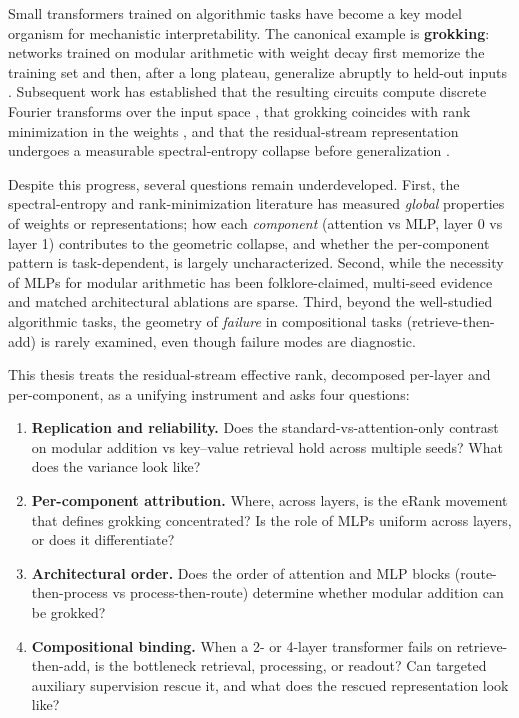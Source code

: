 \documentclass{article}
\begin{document}
Small transformers trained on algorithmic tasks have become a key model organism for mechanistic interpretability. The canonical example is \textbf{grokking}: networks trained on modular arithmetic with weight decay first memorize the training set and then, after a long plateau, generalize abruptly to held-out inputs \citep{power2022grokking}. Subsequent work has established that the resulting circuits compute discrete Fourier transforms over the input space \citep{nanda2023progress}, that grokking coincides with rank minimization in the weights \citep{liu2023grokkingrank,lyu2023dichotomy}, and that the residual-stream representation undergoes a measurable spectral-entropy collapse before generalization \citep{anonymous2026spectral,chen2025complexity}.

Despite this progress, several questions remain underdeveloped. First, the spectral-entropy and rank-minimization literature has measured \emph{global} properties of weights or representations; how each \emph{component} (attention vs MLP, layer 0 vs layer 1) contributes to the geometric collapse, and whether the per-component pattern is task-dependent, is largely uncharacterized. Second, while the necessity of MLPs for modular arithmetic has been folklore-claimed, multi-seed evidence and matched architectural ablations are sparse. Third, beyond the well-studied algorithmic tasks, the geometry of \emph{failure} in compositional tasks (retrieve-then-add) is rarely examined, even though failure modes are diagnostic.

This thesis treats the residual-stream effective rank, decomposed per-layer and per-component, as a unifying instrument and asks four questions:
\begin{enumerate}
    \item \textbf{Replication and reliability.} Does the standard-vs-attention-only contrast on modular addition vs key--value retrieval hold across multiple seeds? What does the variance look like?
    \item \textbf{Per-component attribution.} Where, across layers, is the eRank movement that defines grokking concentrated? Is the role of MLPs uniform across layers, or does it differentiate?
    \item \textbf{Architectural order.} Does the order of attention and MLP blocks (route-then-process vs process-then-route) determine whether modular addition can be grokked?
    \item \textbf{Compositional binding.} When a 2- or 4-layer transformer fails on retrieve-then-add, is the bottleneck retrieval, processing, or readout? Can targeted auxiliary supervision rescue it, and what does the rescued representation look like?
\end{enumerate}
\end{document}
